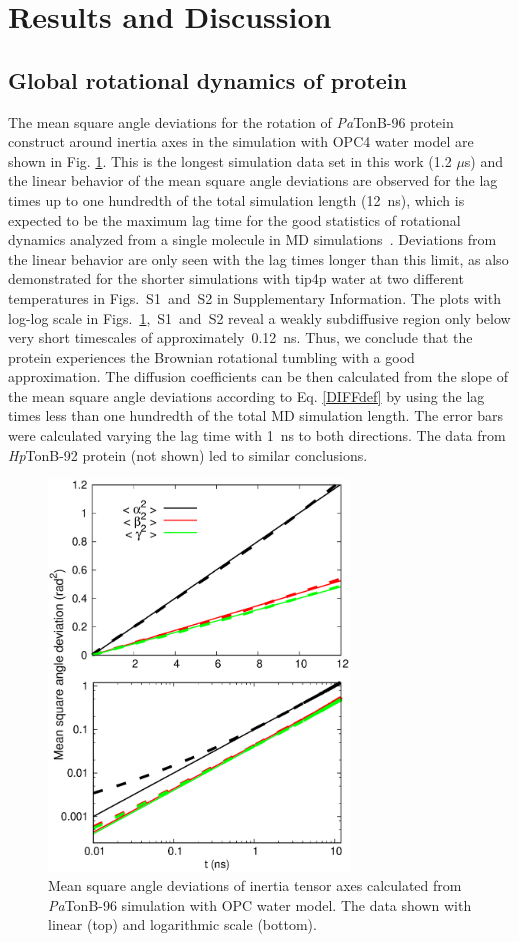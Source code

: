 \documentclass[journal=jpcbfk,manuscript=article]{achemso}
\begin{document}
\section{Results and Discussion}

\subsection{Global rotational dynamics of protein}

The mean square angle deviations for the rotation of {\it Pa}TonB-96 protein construct
around inertia axes in the simulation with OPC4 water model
are shown in Fig. \ref{RMASDplot}. This is the longest
simulation data set in this work (1.2 $\mu$s) and the
linear behavior of the mean square angle deviations are observed
for the lag times up to one hundredth of the total simulation length (12~ns),
which is expected to be the maximum lag time for the good statistics
of rotational dynamics analyzed from a single molecule in MD simulations~\cite{lu06}.
Deviations from the linear behavior are only seen with the lag times longer
than this limit, as also demonstrated for the shorter simulations
with tip4p water at two different temperatures
in Figs.~S1~and~S2 in Supplementary Information.
The plots with log-log scale in
Figs.~\ref{RMASDplot},~S1~and~S2
reveal a weakly subdiffusive region only below very short timescales
of approximately~0.12~ns. Thus, we conclude that the protein
experiences the Brownian rotational tumbling with  a good approximation.
The diffusion coefficients can be then calculated from the slope of the mean square angle
deviations according to Eq. \ref{DIFFdef} by using the lag times less than
one hundredth of the total MD simulation length.
The error bars were calculated varying the lag time with 1~ns to both directions.
The data from {\it Hp}TonB-92 protein (not shown) led to similar conclusions.
\begin{figure}[htb]
  \includegraphics[width=8.0cm]{../Figs/RMASDplotPsTonBOPC4.eps}%
  \caption{Mean square angle deviations of inertia tensor axes calculated from
    {\it Pa}TonB-96 simulation with OPC water model. The data shown with linear (top) and logarithmic scale (bottom).
    \label{RMASDplot}}%
\end{figure}
\end{document}
